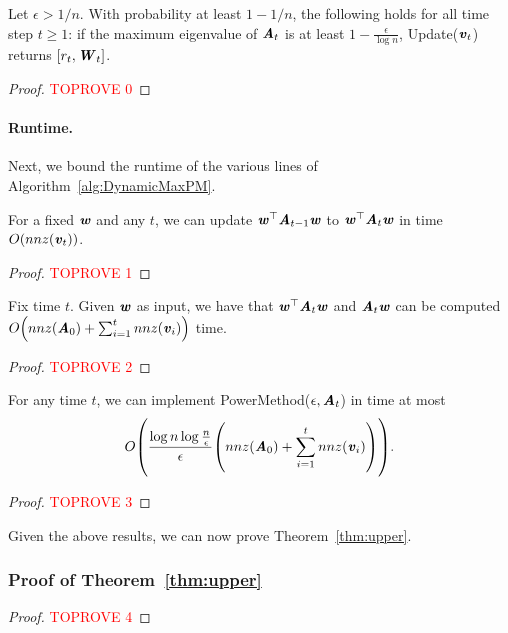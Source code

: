\begin{lemma}\label{lem:DynCorrectAns}
Let $\epsilon>1/n$. With probability at least $1-1/n$, the following holds for all time step $t \ge 1$: 
if the maximum eigenvalue of $\AA_t$ is at least $1-\frac{\epsilon}{\log n}$, {\sc Update}($\vv_t$) returns $[r_t,\WW_t]$.
\end{lemma}
\begin{proof}\textcolor{red}{TOPROVE 0}\end{proof}



\paragraph{Runtime.}\label{sec:runtime}

Next, we bound the runtime of the various lines of Algorithm~\ref{alg:DynamicMaxPM}. 
%
\begin{lemma}\label{lem:SameW}
For a fixed $\ww$ and any $t$, we can update $\ww^{\top}\AA_{t-1}\ww$ to $\ww^{\top}\AA_t\ww$ in time $O(nnz(\vv_t))$.
\end{lemma}
\begin{proof}\textcolor{red}{TOPROVE 1}\end{proof}
%
\begin{lemma}\label{lem:DiffW}
Fix time $t$. Given $\ww$ as input, we have that $\ww^{\top}\AA_t\ww$ and $\AA_t\ww$ can be computed $O\left(nnz(\AA_0) +\sum_{i=1}^t nnz(\vv_i)\right)$ time.
\end{lemma}
\begin{proof}\textcolor{red}{TOPROVE 2}\end{proof}
%
\begin{lemma}\label{lem:PMt}For any time $t$, we can implement {\sc PowerMethod}($\epsilon,\AA_t$) in time at most 
\[
O\left(\frac{\log n\log \frac{n}{\epsilon}}{\epsilon}\left(nnz(\AA_0) +\sum_{i=1}^t nnz(\vv_i)\right)\right).
\]
\end{lemma}
\begin{proof}\textcolor{red}{TOPROVE 3}\end{proof}

 Given the above results, we can now prove Theorem~\ref{thm:upper}.
\subsubsection*{Proof of Theorem~\ref{thm:upper}}
\begin{proof}\textcolor{red}{TOPROVE 4}\end{proof}


